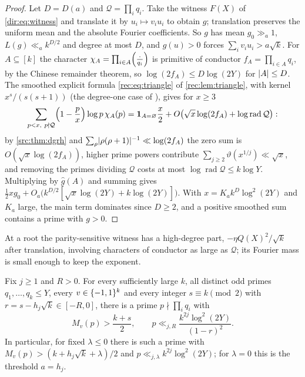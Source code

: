 \begin{proof}
Let $D=D(a)$ and $\mathcal Q=\prod_iq_i$. Take the witness $F(X)$ of \eqref{dir:eq:witness} and
translate it by $u_i\mapsto v_iu_i$ to obtain $g$; translation preserves the uniform mean and the absolute
Fourier coefficients. So $g$ has mean $g_0\gg_a1$, $L(g)\ll_ak^{D/2}$ and degree at most $D$, and
$g(u)>0$ forces $\sum_iv_iu_i>a\sqrt k$. For $A\subseteq[k]$ the character
$\chi_A=\prod_{i\in A}\Bigl(\frac{\cdot}{q_i}\Bigr)$ is primitive of conductor $f_A=\prod_{i\in A}q_i$, by
the Chinese remainder theorem, so $\log(2f_A)\le D\log(2Y)$ for $\lvert A\rvert\le D$. The smoothed
explicit formula \eqref{rec:eq:triangle} of \cref{rec:lem:triangle}, with kernel $x^s/(s(s+1))$ (the degree-one
case of \cite[Lemma~6]{Bellaiche2016Chebotarev}), gives for $x\ge3$
\[
 \sum_{p<x,\ p\nmid\mathcal Q}\Bigl(1-\frac px\Bigr)\log p\,\chi_A(p)
 =\mathbf 1_{A=\varnothing}\frac x2+O\bigl(\sqrt x\log(2f_A)+\log\operatorname{rad}\mathcal Q\bigr):
\]
by \cref{src:thm:dgrh} and $\sum_\rho\lvert\rho(\rho+1)\rvert^{-1}\ll\log(2f_A)$ the zero sum is
$O(\sqrt x\log(2f_A))$, higher prime powers contribute
$\sum_{j\ge2}\vartheta(x^{1/j})\ll\sqrt x$, and removing the primes dividing $\mathcal Q$ costs at
most $\log\operatorname{rad}\mathcal Q\le k\log Y$. Multiplying by $\widehat g(A)$ and summing gives
$\frac12xg_0+O_a\bigl(k^{D/2}[\sqrt x\log(2Y)+k\log(2Y)]\bigr)$. With
$x=K_ak^D\log^2(2Y)$ and $K_a$ large, the main term dominates since $D\ge2$, and a positive
smoothed sum contains a prime with $g>0$.
\end{proof}

At a root the parity-sensitive witness has a high-degree part, $-\eta Q(X)^2/\sqrt k$ after translation,
involving characters of conductor as large as $\mathcal Q$; its Fourier mass is small enough to keep the
exponent.

\begin{theorem}\label{dir:thm:signswindow}
Fix $j\ge1$ and $R>0$. For every sufficiently large $k$, all distinct odd primes $q_1,\dots,q_k\le Y$,
every $v\in\{-1,1\}^k$ and every integer $s\equiv k\pmod2$ with $r=s-h_j\sqrt k\in[-R,0]$, there is a
prime $p\nmid\prod_iq_i$ with
\[
 M_v(p)>\frac{k+s}2,\qquad p\ll_{j,R}\frac{k^{2j}\log^2(2Y)}{(1-r)^2}.
\]
In particular, for fixed $\lambda\le0$ there is such a prime with $M_v(p)>(k+h_j\sqrt k+\lambda)/2$ and
$p\ll_{j,\lambda}k^{2j}\log^2(2Y)$; for $\lambda=0$ this is the threshold $a=h_j$.
\end{theorem}

